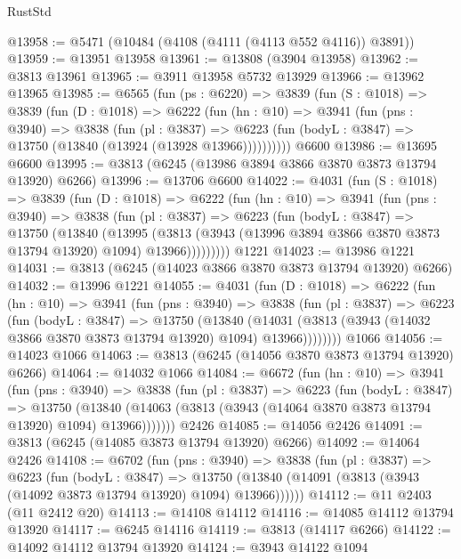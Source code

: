 \begin{lexlean}{RustStd}
\begin{coremodule}
@13958 := @5471 (@10484 (@4108 (@4111 (@4113 @552 @4116)) @3891))
@13959 := @13951 @13958
@13961 := @13808 (@3904 @13958)
@13962 := @3813 @13961
@13965 := @3911 @13958 @5732 @13929
@13966 := @13962 @13965
@13985 := @6565
    (fun (ps : @6220) =>
    @3839
      (fun (S : @1018) =>
      @3839
        (fun (D : @1018) =>
        @6222
          (fun (hn : @10) =>
          @3941
            (fun (pns : @3940) =>
            @3838
              (fun (pl : @3837) =>
              @6223 (fun (bodyL : @3847) => @13750 (@13840 (@13924 (@13928 @13966))))))))))
    @6600
@13986 := @13695 @6600
@13995 := @3813 (@6245 (@13986 @3894 @3866 @3870 @3873 @13794 @13920) @6266)
@13996 := @13706 @6600
@14022 := @4031
    (fun (S : @1018) =>
    @3839
      (fun (D : @1018) =>
      @6222
        (fun (hn : @10) =>
        @3941
          (fun (pns : @3940) =>
          @3838
            (fun (pl : @3837) =>
            @6223
              (fun (bodyL : @3847) =>
              @13750
                (@13840
                  (@13995
                    (@3813
                      (@3943 (@13996 @3894 @3866 @3870 @3873 @13794 @13920) @1094)
                      @13966)))))))))
    @1221
@14023 := @13986 @1221
@14031 := @3813 (@6245 (@14023 @3866 @3870 @3873 @13794 @13920) @6266)
@14032 := @13996 @1221
@14055 := @4031
    (fun (D : @1018) =>
    @6222
      (fun (hn : @10) =>
      @3941
        (fun (pns : @3940) =>
        @3838
          (fun (pl : @3837) =>
          @6223
            (fun (bodyL : @3847) =>
            @13750
              (@13840
                (@14031 (@3813 (@3943 (@14032 @3866 @3870 @3873 @13794 @13920) @1094) @13966))))))))
    @1066
@14056 := @14023 @1066
@14063 := @3813 (@6245 (@14056 @3870 @3873 @13794 @13920) @6266)
@14064 := @14032 @1066
@14084 := @6672
    (fun (hn : @10) =>
    @3941
      (fun (pns : @3940) =>
      @3838
        (fun (pl : @3837) =>
        @6223
          (fun (bodyL : @3847) =>
          @13750
            (@13840 (@14063 (@3813 (@3943 (@14064 @3870 @3873 @13794 @13920) @1094) @13966)))))))
    @2426
@14085 := @14056 @2426
@14091 := @3813 (@6245 (@14085 @3873 @13794 @13920) @6266)
@14092 := @14064 @2426
@14108 := @6702
    (fun (pns : @3940) =>
    @3838
      (fun (pl : @3837) =>
      @6223
        (fun (bodyL : @3847) =>
        @13750 (@13840 (@14091 (@3813 (@3943 (@14092 @3873 @13794 @13920) @1094) @13966))))))
@14112 := @11 @2403 (@11 @2412 @20)
@14113 := @14108 @14112
@14116 := @14085 @14112 @13794 @13920
@14117 := @6245 @14116
@14119 := @3813 (@14117 @6266)
@14122 := @14092 @14112 @13794 @13920
@14124 := @3943 @14122 @1094

\end{coremodule}
\end{lexlean}
